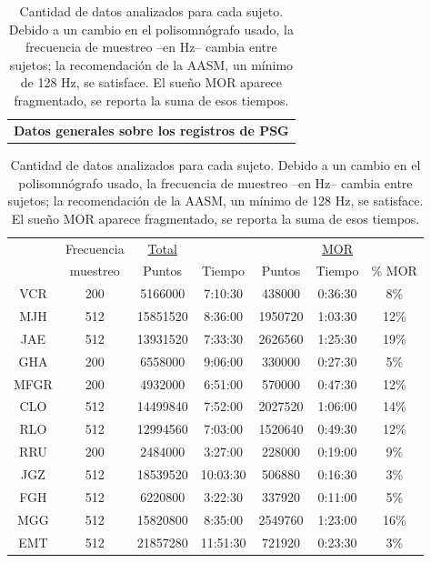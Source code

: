 \documentclass[12pt,a4paper]{mitthesis}
\begin{document}
\begin{table}
\centering
\begin{tabular}{c}
\textbf{Datos generales sobre los registros de PSG}
\vspace{1em}
\end{tabular}
\begin{tabular}{c||c|cc|ccc}
    &Frecuencia& \underline{Total}& &   &\underline{MOR} &         \\
    &muestreo  &Puntos  &  Tiempo   &Puntos  &  Tiempo   &  \% MOR \\
\hline
\hline
VCR &200       & 5166000&   7:10:30 &438000  &   0:36:30 & 8\% \\
MJH &512       &15851520&   8:36:00 &1950720 &   1:03:30 &12\% \\
JAE &512       &13931520&   7:33:30 &2626560 &   1:25:30 &19\% \\
GHA &200       &6558000 &   9:06:00 &330000  &   0:27:30 & 5\% \\
MFGR&200       &4932000 &   6:51:00 &570000  &   0:47:30 &12\% \\
\hline
CLO &512       &14499840&   7:52:00 &2027520 &   1:06:00 &14\% \\
RLO &512       &12994560&   7:03:00 &1520640 &   0:49:30 &12\% \\
RRU &200       &2484000 &   3:27:00 &228000  &   0:19:00 & 9\% \\
JGZ &512       &18539520&  10:03:30 &506880  &   0:16:30 & 3\% \\
\hline
FGH &512       &6220800 &   3:22:30 &337920  &   0:11:00 & 5\% \\
MGG &512       &15820800&   8:35:00 &2549760 &   1:23:00 &16\% \\
EMT &512       &21857280&  11:51:30 &721920  &   0:23:30 & 3\%
\end{tabular}
\caption{Cantidad de datos analizados para cada sujeto. Debido a un cambio en el polisomn\'ografo 
usado, la frecuencia de muestreo --en Hz-- cambia entre sujetos; la recomendaci\'on de la AASM, un 
m\'inimo de 128 Hz, se satisface.
El sue\~no MOR aparece fragmentado, se reporta la suma de esos tiempos.}
\label{frecuencias}
\end{table}
\end{document}
